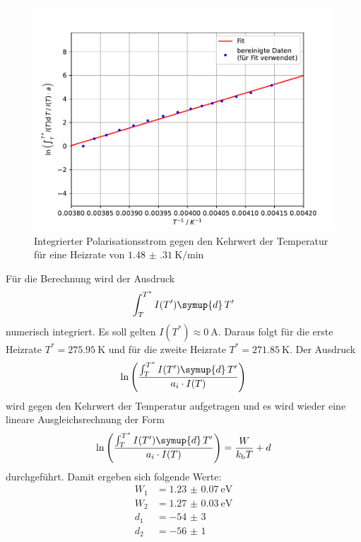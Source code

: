 \begin{figure}[h!]
  \centering
  \includegraphics[scale=0.8]{fig/plot6.pdf}
  \caption{Integrierter Polarisationsstrom gegen den Kehrwert der Temperatur für eine Heizrate von $\SI{1.48(31)}{\kelvin\per\minute}$}
  \label{fig:6}
\end{figure}
\FloatBarrier
Für die Berechnung wird der Ausdruck
\begin{align*}
      \int_T^{T^*} I(T') \symup{d}\,T'
\end{align*}
numerisch integriert. Es soll gelten $I(T^*)\approx\SI{0}{\ampere}$. Daraus folgt für die erste Heizrate $T^*=\SI{275.95}{\kelvin}$ und für die zweite Heizrate $T^*=\SI{271.85}{\kelvin}$.
Der Ausdruck
\begin{align*}
   \ln\left(\frac{\int_T^{T^*} I(T') \symup{d}\,T'}{a_i \cdot I(T)}\right)
\end{align*}
wird gegen den Kehrwert der Temperatur aufgetragen und es wird wieder eine lineare Ausgleichsrechnung der Form
\begin{equation*}
  \ln\left(\frac{\int_T^{T^*} I(T') \symup{d}\,T'}{a_i \cdot I(T)}\right)=\dfrac{W}{k_\mathrm{b}T}+d
\end{equation*}
durchgeführt. Damit ergeben sich folgende Werte:
\begin{align*}
    W_\mathrm{1} &= \SI{1.23(7)}{\electronvolt} \\
    W_\mathrm{2} &= \SI{1.27(3)}{\electronvolt} \\
    d_\mathrm{1} &= \num{-54(3)} \\
    d_\mathrm{2} &= \num{-56(1)}
\end{align*}
